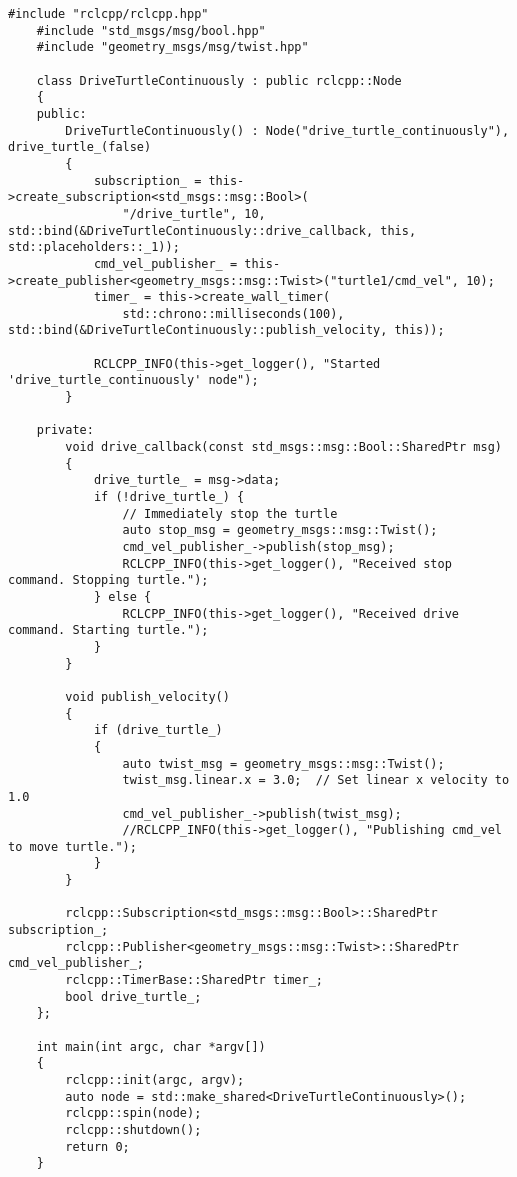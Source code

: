 \begin{lstlisting}[caption={\texttt{/drive\_turtle\_continuously} source code}, label={lst:drive_turtle_continuously_source_code}]
    #include "rclcpp/rclcpp.hpp"
    #include "std_msgs/msg/bool.hpp"
    #include "geometry_msgs/msg/twist.hpp"
    
    class DriveTurtleContinuously : public rclcpp::Node
    {
    public:
        DriveTurtleContinuously() : Node("drive_turtle_continuously"), drive_turtle_(false)
        {
            subscription_ = this->create_subscription<std_msgs::msg::Bool>(
                "/drive_turtle", 10, std::bind(&DriveTurtleContinuously::drive_callback, this, std::placeholders::_1));
            cmd_vel_publisher_ = this->create_publisher<geometry_msgs::msg::Twist>("turtle1/cmd_vel", 10);
            timer_ = this->create_wall_timer(
                std::chrono::milliseconds(100), std::bind(&DriveTurtleContinuously::publish_velocity, this));
    
            RCLCPP_INFO(this->get_logger(), "Started 'drive_turtle_continuously' node");
        }
    
    private:
        void drive_callback(const std_msgs::msg::Bool::SharedPtr msg)
        {
            drive_turtle_ = msg->data;
            if (!drive_turtle_) {
                // Immediately stop the turtle
                auto stop_msg = geometry_msgs::msg::Twist();
                cmd_vel_publisher_->publish(stop_msg);
                RCLCPP_INFO(this->get_logger(), "Received stop command. Stopping turtle.");
            } else {
                RCLCPP_INFO(this->get_logger(), "Received drive command. Starting turtle.");
            }
        }
    
        void publish_velocity()
        {
            if (drive_turtle_)
            {
                auto twist_msg = geometry_msgs::msg::Twist();
                twist_msg.linear.x = 3.0;  // Set linear x velocity to 1.0
                cmd_vel_publisher_->publish(twist_msg);
                //RCLCPP_INFO(this->get_logger(), "Publishing cmd_vel to move turtle.");
            }
        }
    
        rclcpp::Subscription<std_msgs::msg::Bool>::SharedPtr subscription_;
        rclcpp::Publisher<geometry_msgs::msg::Twist>::SharedPtr cmd_vel_publisher_;
        rclcpp::TimerBase::SharedPtr timer_;
        bool drive_turtle_;
    };
    
    int main(int argc, char *argv[])
    {
        rclcpp::init(argc, argv);
        auto node = std::make_shared<DriveTurtleContinuously>();
        rclcpp::spin(node);
        rclcpp::shutdown();
        return 0;
    }
    
\end{lstlisting}


